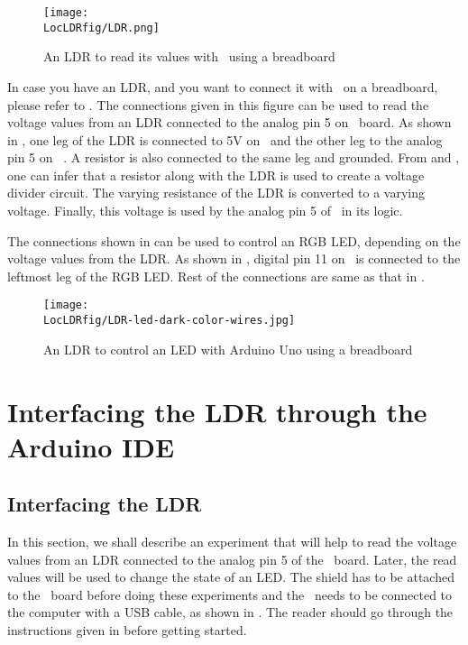 \begin{figure}
  \centering
  \texttt{[image: \\LocLDRfig/LDR.png]}
  \caption{An LDR to read its values with \arduino\ using a breadboard}
  \label{fig:ard-ldr}
\end{figure}

In case you have an LDR, and you want to connect it with \arduino\ on a breadboard, 
please refer to . The connections given in this figure can be 
used to read the voltage values from an LDR connected to the analog pin 5 on 
\arduino\ board. As shown in , one leg of the LDR is connected 
to 5V on \arduino\ and the other leg to the analog pin 5 on  \arduino. A resistor is also connected to the same leg and grounded. 
From  and , one can infer that a resistor 
along with the LDR is used to create a voltage divider circuit. The varying 
resistance of the LDR is converted to a varying voltage. Finally, this voltage is used 
by the analog pin 5 of \arduino\ in its logic. 

The connections shown in  can be used to control an RGB LED, 
depending on the voltage values from the LDR. As shown in , 
digital pin 11 on \arduino\ is connected to the leftmost leg of the RGB LED. Rest of the connections
are same as that in . 

\begin{figure}
  \centering
  \texttt{[image: \\LocLDRfig/LDR-led-dark-color-wires.jpg]}
  \caption{An LDR to control an LED with Arduino Uno using a breadboard}
  \label{fig:ard-ldr-led}
\end{figure}


\section{Interfacing the LDR through the Arduino IDE}
\subsection{Interfacing the LDR}
In this section, we shall describe an experiment that will help 
to read the voltage values from an LDR connected to the analog pin 5 
of the \arduino\ board. Later, the read values will be used to change the state of an LED.  The shield has to be attached to the \arduino\ board
before doing these experiments and the \arduino\ needs to be connected to the computer 
with a USB cable, as shown in . The reader should go through the
instructions given in  before getting started.

